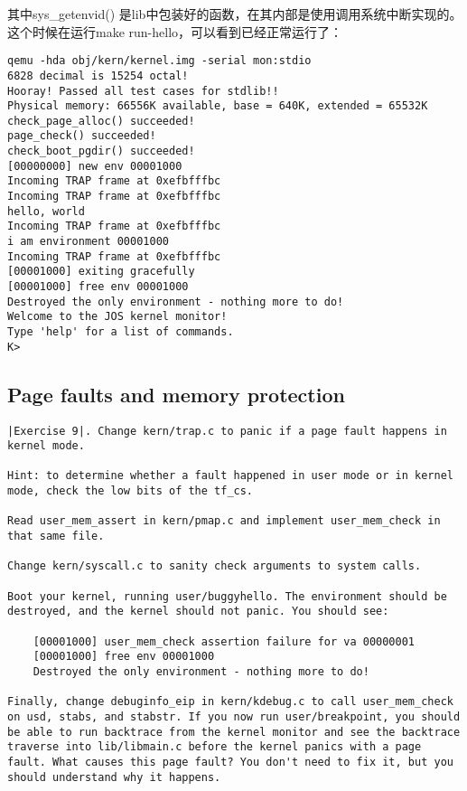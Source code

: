 \documentclass{article}
\newcommand{\funcname}[1]{{\ttfamily \small #1}}
\begin{document}
\begin{CJK*}{UTF8}{gkai}
其中\funcname{sys\_getenvid()} 是lib中包装好的函数，在其内部是使用调用系统中断实现的。这个时候在运行make run-hello，可以看到已经正常运行了：

\begin{lstlisting}[style=console]
qemu -hda obj/kern/kernel.img -serial mon:stdio
6828 decimal is 15254 octal!
Hooray! Passed all test cases for stdlib!!
Physical memory: 66556K available, base = 640K, extended = 65532K
check_page_alloc() succeeded!
page_check() succeeded!
check_boot_pgdir() succeeded!
[00000000] new env 00001000
Incoming TRAP frame at 0xefbfffbc
Incoming TRAP frame at 0xefbfffbc
hello, world
Incoming TRAP frame at 0xefbfffbc
i am environment 00001000
Incoming TRAP frame at 0xefbfffbc
[00001000] exiting gracefully
[00001000] free env 00001000
Destroyed the only environment - nothing more to do!
Welcome to the JOS kernel monitor!
Type 'help' for a list of commands.
K> 

\end{lstlisting}

\subsection{Page faults and memory protection}

\begin{lstlisting}[style=exercise]
|Exercise 9|. Change kern/trap.c to panic if a page fault happens in kernel mode.

Hint: to determine whether a fault happened in user mode or in kernel mode, check the low bits of the tf_cs.

Read user_mem_assert in kern/pmap.c and implement user_mem_check in that same file.

Change kern/syscall.c to sanity check arguments to system calls.

Boot your kernel, running user/buggyhello. The environment should be destroyed, and the kernel should not panic. You should see:

	[00001000] user_mem_check assertion failure for va 00000001
	[00001000] free env 00001000
	Destroyed the only environment - nothing more to do!
	
Finally, change debuginfo_eip in kern/kdebug.c to call user_mem_check on usd, stabs, and stabstr. If you now run user/breakpoint, you should be able to run backtrace from the kernel monitor and see the backtrace traverse into lib/libmain.c before the kernel panics with a page fault. What causes this page fault? You don't need to fix it, but you should understand why it happens.
\end{lstlisting}


\end{CJK*}
\end{document}
